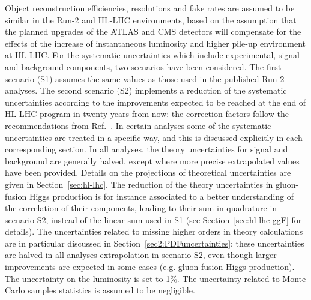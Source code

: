 Object reconstruction efficiencies, resolutions and fake rates are assumed to be similar in the Run-2 and HL-LHC environments, based on the assumption that the planned upgrades of the ATLAS and CMS detectors will compensate for the effects of the increase of instantaneous luminosity and higher pile-up environment at HL-LHC.
For the systematic uncertainties which include experimental, signal and background components, two scenarios have been considered.
The first scenario (S1) assumes the same values as those used in the published Run-2 analyses.
The second scenario (S2) implements a reduction of the systematic uncertainties according to the improvements expected to be reached at the end of HL-LHC program in twenty years from now: the correction factors follow the recommendations from Ref.~\cite{HLHELHCCommonSystematics}.
In certain analyses some of the systematic uncertainties are treated in a specific way, and this is discussed explicitly in each corresponding section.
%
In all analyses, the theory uncertainties for signal and background are generally halved, except where more precise extrapolated values have been provided. Details on the projections of theoretical uncertainties are given in Section~\ref{sec:hl-lhc}. The reduction of the theory uncertainties in gluon-fusion Higgs production is for instance associated to a better understanding of the correlation of their components, leading to their sum in quadrature in scenario S2, instead of the linear sum used in S1 (see Section~\ref{sec:hl-lhc-ggF} for details). The uncertainties related to missing higher orders in theory calculations are in particular discussed in Section~\ref{sec2:PDFuncertainties}: these uncertainties are halved in all analyses extrapolation in scenario S2, even though larger improvements are expected in some cases (e.g. gluon-fusion Higgs production).
%
The uncertainty on the luminosity is set to 1\%.
The uncertainty related to Monte Carlo samples statistics is assumed to be negligible.

